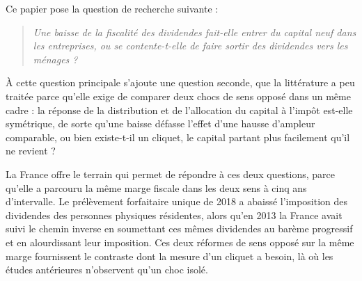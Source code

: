 Ce papier pose la question de recherche suivante :

\begin{quote}
\itshape
Une baisse de la fiscalité des dividendes fait-elle entrer du capital neuf dans les entreprises, ou
se contente-t-elle de faire sortir des dividendes vers les ménages ?
\end{quote}

\noindent À cette question principale s'ajoute une question seconde, que la littérature a peu
traitée parce qu'elle exige de comparer deux chocs de sens opposé dans un même cadre : la réponse de
la distribution et de l'allocation du capital à l'impôt est-elle symétrique, de sorte qu'une baisse
défasse l'effet d'une hausse d'ampleur comparable, ou bien existe-t-il un cliquet, le capital
partant plus facilement qu'il ne revient ?

La France offre le terrain qui permet de répondre à ces deux questions, parce qu'elle a parcouru la
même marge fiscale dans les deux sens à cinq ans d'intervalle. Le prélèvement forfaitaire unique de
2018 a abaissé l'imposition des dividendes des personnes physiques résidentes, alors qu'en 2013 la
France avait suivi le chemin inverse en soumettant ces mêmes dividendes au barème progressif et en
alourdissant leur imposition. Ces deux réformes de sens opposé sur la même marge fournissent le
contraste dont la mesure d'un cliquet a besoin, là où les études antérieures n'observent qu'un choc
isolé.

